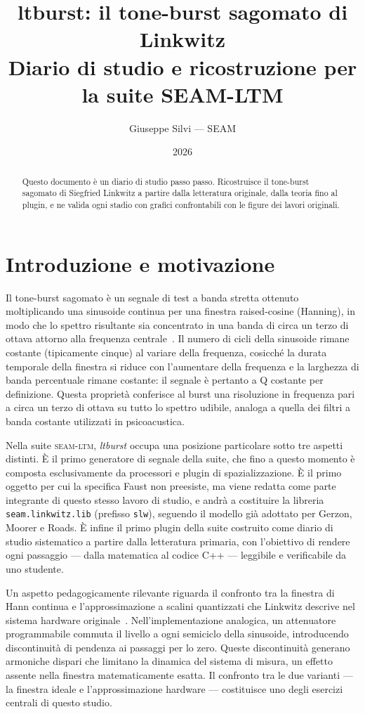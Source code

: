 \documentclass[11pt,a4paper]{article}
\title{ltburst: il tone-burst sagomato di Linkwitz\\\large Diario di studio e ricostruzione per la suite SEAM-LTM}
\author{Giuseppe Silvi --- SEAM}
\date{2026}
\begin{document}
\maketitle
\begin{abstract}
Questo documento \`e un diario di studio passo passo.
Ricostruisce il tone-burst sagomato di Siegfried Linkwitz a partire dalla letteratura originale, dalla teoria fino al plugin, e ne valida ogni stadio con grafici confrontabili con le figure dei lavori originali.
\end{abstract}
\tableofcontents

\section{Introduzione e motivazione}\label{sec:intro}

Il tone-burst sagomato è un segnale di test a banda stretta ottenuto moltiplicando una sinusoide continua per una finestra raised-cosine (Hanning), in modo che lo spettro risultante sia concentrato in una banda di circa un terzo di ottava attorno alla frequenza centrale~\cite{linkwitz1978narrowband, linkwitz1980shaped}.
Il numero di cicli della sinusoide rimane costante (tipicamente cinque) al variare della frequenza, cosicché la durata temporale della finestra si riduce con l'aumentare della frequenza e la larghezza di banda percentuale rimane costante: il segnale è pertanto a Q costante per definizione.
Questa proprietà conferisce al burst una risoluzione in frequenza pari a circa un terzo di ottava su tutto lo spettro udibile, analoga a quella dei filtri a banda costante utilizzati in psicoacustica.

Nella suite \textsc{seam-ltm}, \emph{ltburst} occupa una posizione particolare sotto tre aspetti distinti.
È il primo generatore di segnale della suite, che fino a questo momento è composta esclusivamente da processori e plugin di spazializzazione.
È il primo oggetto per cui la specifica Faust non preesiste, ma viene redatta come parte integrante di questo stesso lavoro di studio, e andrà a costituire la libreria \texttt{seam.linkwitz.lib} (prefisso \texttt{slw}), seguendo il modello già adottato per Gerzon, Moorer e Roads.
È infine il primo plugin della suite costruito come diario di studio sistematico a partire dalla letteratura primaria, con l'obiettivo di rendere ogni passaggio — dalla matematica al codice C++ — leggibile e verificabile da uno studente.

Un aspetto pedagogicamente rilevante riguarda il confronto tra la finestra di Hann continua e l'approssimazione a scalini quantizzati che Linkwitz descrive nel sistema hardware originale~\cite{linkwitz1980shaped}.
Nell'implementazione analogica, un attenuatore programmabile commuta il livello a ogni semiciclo della sinusoide, introducendo discontinuità di pendenza ai passaggi per lo zero.
Queste discontinuità generano armoniche dispari che limitano la dinamica del sistema di misura, un effetto assente nella finestra matematicamente esatta.
Il confronto tra le due varianti — la finestra ideale e l'approssimazione hardware — costituisce uno degli esercizi centrali di questo studio.
\end{document}
